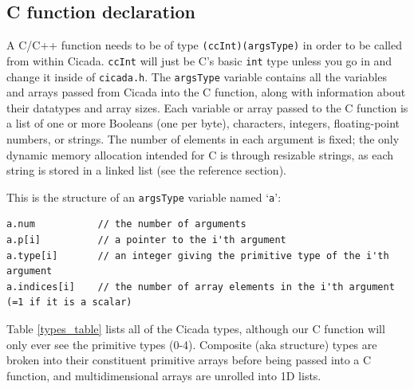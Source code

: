 \documentclass{article}
\newenvironment{code}{
       \begin{list}{}{
               \setlength{\leftmargin}{.4in}
               \setlength{\rightmargin}{0in}
               \setlength{\topsep}{.2in}
       }
       \small
       \item[] }
       { \end{list}   }
\begin{document}
\subsection{C function declaration}

A C/C++ function needs to be of type \verb#(ccInt)(argsType)# in order to be called from within Cicada.  \verb#ccInt# will just be C's basic \verb#int# type unless you go in and change it inside of \verb#cicada.h#.  The \verb#argsType# variable contains all the variables and arrays passed from Cicada into the C function, along with information about their datatypes and array sizes.  Each variable or array passed to the C function is a list of one or more Booleans (one per byte), characters, integers, floating-point numbers, or strings.  The number of elements in each argument is fixed; the only dynamic memory allocation intended for C is through resizable strings, as each string is stored in a linked list (see the reference section).

This is the structure of an \verb#argsType# variable named `\verb#a#':

\begin{code} \begin{verbatim}
a.num           // the number of arguments
a.p[i]          // a pointer to the i'th argument
a.type[i]       // an integer giving the primitive type of the i'th argument
a.indices[i]    // the number of array elements in the i'th argument (=1 if it is a scalar)
\end{verbatim} \end{code}

\noindent Table \ref{types_table} lists all of the Cicada types, although our C function will only ever see the primitive types (0-4).  Composite (aka structure) types are broken into their constituent primitive arrays before being passed into a C function, and multidimensional arrays are unrolled into 1D lists.\\
\end{document}
